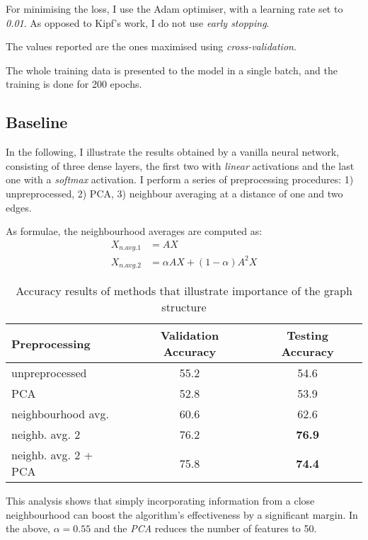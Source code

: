 \documentclass[10pt,a4]{article}
\begin{document}
    For minimising the loss, I use the Adam \cite{kingma2014adam} optimiser, with 
    a learning rate set to \emph{0.01}. As opposed to Kipf's work, I do not use 
    \emph{early stopping}. 

    The values reported are the ones maximised using \emph{cross-validation}.

    The whole training data is presented to the model in a single batch, and the 
    training is done for 200 epochs. 

    \subsection{Baseline}
    \label{sec:baseline}

    In the following, I illustrate the results obtained by a vanilla neural network,
    consisting of three dense layers, the first two with \emph{linear} activations and 
    the last one with a \emph{softmax} activation. I perform a series of 
    preprocessing procedures: 
    1) unpreprocessed, 2) PCA, 3) neighbour averaging at a distance of one and two 
    edges.

    As formulae, the neighbourhood averages are computed as: 
    \begin{align*}
        X_{n.avg.1} &= AX  \\
        X_{n.avg.2} &= \alpha A X + (1-\alpha) A^2 X
    \end{align*}
    
    \begin{table}[h!]
        \centering
        \label{tab:baseline}
        \begin{tabular}{l c c}
            \textbf{Preprocessing} & \textbf{Validation Accuracy} & \textbf{Testing Accuracy} \\
            \hline
            unpreprocessed  & 55.2 & 54.6 \\
            PCA             & 52.8 & 53.9 \\
            neighbourhood avg. & 60.6 & 62.6 \\
            neighb. avg. 2  & 76.2 & \textbf{76.9} \\
            neighb. avg. 2 + PCA & 75.8 & \textbf{74.4} 
        \end{tabular}
        \caption{Accuracy results of methods that illustrate importance of the graph structure}
    \end{table}

    This analysis shows that simply incorporating information from a close 
    neighbourhood can boost the algorithm's effectiveness by a significant margin.
    In the above, $\alpha=0.55$ and the \emph{PCA} reduces the number of features 
    to 50.
\end{document}
